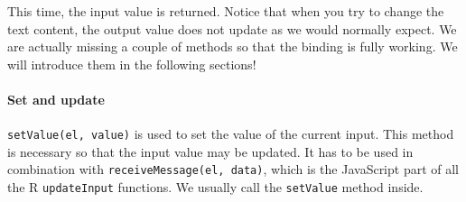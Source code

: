 \documentclass[]{book}
\newenvironment{Shaded}{\begin{snugshade}}{\end{snugshade}}
\newcommand{\ControlFlowTok}[1]{\textcolor[rgb]{0.13,0.29,0.53}{\textbf{#1}}}
\newcommand{\KeywordTok}[1]{\textcolor[rgb]{0.13,0.29,0.53}{\textbf{#1}}}
\newcommand{\NormalTok}[1]{#1}
\newcommand{\OperatorTok}[1]{\textcolor[rgb]{0.81,0.36,0.00}{\textbf{#1}}}
\newcommand{\StringTok}[1]{\textcolor[rgb]{0.31,0.60,0.02}{#1}}
\let\oldparagraph\paragraph
\renewcommand{\paragraph}[1]{\oldparagraph{#1}\mbox{}}
\begin{document}
\begin{Shaded}
\end{Shaded}

This time, the input value is returned. Notice that when you try to change the text content, the output value does not update as we would normally expect. We are actually missing a couple of methods so that the binding is fully working. We will introduce them in the following sections!

\hypertarget{set-and-update}{%
\paragraph{Set and update}\label{set-and-update}}

\texttt{setValue(el,\ value)} is used to set the value of the current input. This method is necessary so that the input value may be updated. It has to be used in combination with \texttt{receiveMessage(el,\ data)}, which is the JavaScript part of all the R \texttt{updateInput} functions. We usually call the \texttt{setValue} method inside.
\end{document}
